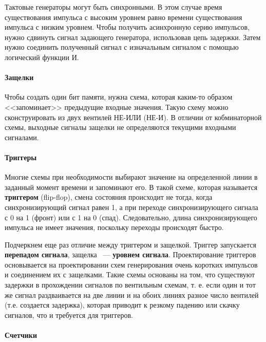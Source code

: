 \documentclass[10pt]{article}
\begin{document}
	Тактовые генераторы могут быть синхронными. В этом случае время существования импульса с высоким уровнем равно времени существования импульса с низким уровнем. Чтобы получить асинхронную серию импульсов, нужно сдвинуть сигнал задающего генератора,  использовав цепь задержки. Затем нужно соединить полученный сигнал с изначальным сигналом с помощью логический функции И.
	\paragraph{Защелки}
	Чтобы создать один бит памяти, нужна схема, которая каким-то образом <<запоминает>> предыдущие входные значения. Такую схему можно сконструировать из двух вентилей НЕ-ИЛИ (НЕ-И). В отличии от кобминаторной схемы, выходные сигналы защелки не определяются текущими входными сигналами.
	\paragraph{Триггеры}
	Многие схемы при необходимости выбирают значение на определенной линии в заданный момент времени и запоминают его. В такой схеме, которая называется \textbf{триггером} (flip-flop), смена состояния происходит не тогда, когда синхронизирующий сигнал равен 1, а при переходе синхронизирующего сигнала с 0 на 1 (фронт) или с 1 на 0 (спад). Следовательно, длина синхронизирующего импульса не имеет значения, поскольку переходы происходят быстро.

	Подчеркнем еще раз отличие между триггером и защелкой. Триггер запускается \textbf{перепадом сигнала}, защелка ~--- \textbf{уровнем сигнала}. Проектирование триггеров основывается на проектировании схем генерирования очень коротких импульсов и соединением их с защелками. Такие схемы основаны на том, что существуют задержки в прохождении сигналов по вентильным схемам, т. е. если один и тот же сигнал раздваивается на две линии и на обоих линиях разное число вентилей (т.е. создается задержка), которая приводит к резкому падению или скачку сигналов, что и требуется для триггеров.
	\paragraph{Счетчики}
\end{document}
